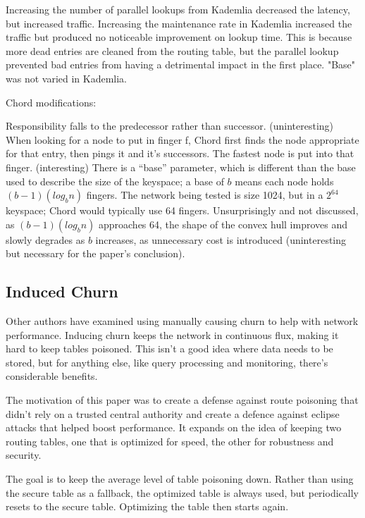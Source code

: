 \documentclass[10pt,letterpaper]{report}
\begin{document}
Increasing the number of parallel lookups from Kademlia decreased the latency, but increased traffic.  Increasing the maintenance rate in Kademlia increased the traffic but produced no noticeable improvement on lookup time.  This is because more dead entries are cleaned from the routing table, but the parallel lookup prevented bad entries from having a detrimental impact in the first place.  "Base" was not varied in Kademlia.

Chord modifications:  

Responsibility falls to the predecessor rather than successor.   (uninteresting)
When looking for a node to put in finger f, Chord first finds the node appropriate for that entry, then pings it and it's successors.  The fastest node is put into that finger.  (interesting)
There is a ``base'' parameter, which is different than the base used to describe the size of the keyspace;  a base of $b$ means each node  holds $(b-1)(log_b n)$ fingers.  The network being tested is size 1024, but in a $2^64$ keyspace;  Chord would typically use 64 fingers.   Unsurprisingly and not discussed, as $(b-1)(log_b n)$ approaches 64, the shape of the convex hull improves and slowly degrades as $b$ increases, as unnecessary cost is introduced  (uninteresting but necessary for the paper's conclusion).


\subsection{Induced Churn}

Other authors have examined using manually causing  churn to help with network performance.
Inducing churn keeps the network in continuous flux, making it hard to keep tables poisoned.   This isn't a good idea where data needs to be stored, but for anything else, like query processing and monitoring, there's considerable benefits. 

The motivation of this paper was to create a  defense against route poisoning that didn't rely on a trusted central authority and create a defence against eclipse attacks that helped boost performance.  It expands on the idea of keeping two routing tables, one that is optimized for speed, the other for robustness and security.

The goal is to keep the average level of table poisoning down.  Rather than using the secure table as a fallback, the optimized table is always used, but periodically resets to the secure table.  Optimizing the table then starts again.
\end{document}
